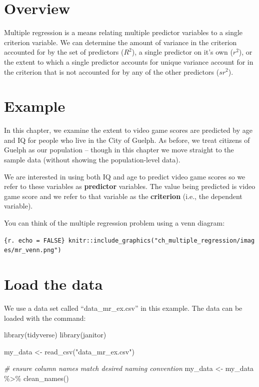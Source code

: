 \documentclass[
]{krantz}
\makeatletter
\newenvironment{Shaded}{\begin{snugshade}}{\end{snugshade}}
\newcommand{\CommentTok}[1]{\textcolor[rgb]{0.37,0.37,0.37}{\textit{#1}}}
\newcommand{\FunctionTok}[1]{\textcolor[rgb]{0,0,0}{#1}}
\newcommand{\NormalTok}[1]{#1}
\newcommand{\OtherTok}[1]{\textcolor[rgb]{0.37,0.37,0.37}{#1}}
\newcommand{\SpecialCharTok}[1]{\textcolor[rgb]{0,0,0}{#1}}
\newcommand{\StringTok}[1]{\textcolor[rgb]{0.5,0.5,0.5}{#1}}
\newenvironment{kframe}{%
\medskip{}
\setlength{\fboxsep}{.8em}
 \def\at@end@of@kframe{}%
 \ifinner\ifhmode%
  \def\at@end@of@kframe{\end{minipage}}%
  \begin{minipage}{\columnwidth}%
 \fi\fi%
 \def\FrameCommand##1{\hskip\@totalleftmargin \hskip-\fboxsep
 \colorbox{shadecolor}{##1}\hskip-\fboxsep
     \hskip-\linewidth \hskip-\@totalleftmargin \hskip\columnwidth}%
 \MakeFramed {\advance\hsize-\width
   \@totalleftmargin\z@ \linewidth\hsize
   \@setminipage}}%
 {\par\unskip\endMakeFramed%
 \at@end@of@kframe}
\renewenvironment{Shaded}{\begin{kframe}}{\end{kframe}}
\makeatother
\begin{document}
\hypertarget{overview-7}{%
\section{Overview}\label{overview-7}}

Multiple regression is a means relating multiple predictor variables to a single criterion variable. We can determine the amount of variance in the criterion accounted for by the set of predictors (\(R^2\)), a single predictor on it's own (\(r^2\)), or the extent to which a single predictor accounts for unique variance account for in the criterion that is not accounted for by any of the other predictors (\(sr^2\)).

\hypertarget{example}{%
\section{Example}\label{example}}

In this chapter, we examine the extent to video game scores are predicted by age and IQ for people who live in the City of Guelph. As before, we treat citizens of Guelph as our population -- though in this chapter we move straight to the sample data (without showing the population-level data).

We are interested in using both IQ and age to predict video game scores so we refer to these variables as \textbf{predictor} variables. The value being predicted is video game score and we refer to that variable as the \textbf{criterion} (i.e., the dependent variable).

You can think of the multiple regression problem using a venn diagram:

\texttt{\{r.\ echo\ =\ FALSE\}\ knitr::include\_graphics("ch\_multiple\_regression/images/mr\_venn.png")}

\hypertarget{load-the-data}{%
\section{Load the data}\label{load-the-data}}

We use a data set called ``data\_mr\_ex.csv'' in this example. The data can be loaded with the command:

\begin{Shaded}
\begin{Highlighting}[]
\FunctionTok{library}\NormalTok{(tidyverse)}
\FunctionTok{library}\NormalTok{(janitor)}

\NormalTok{my\_data }\OtherTok{\textless{}{-}} \FunctionTok{read\_csv}\NormalTok{(}\StringTok{"data\_mr\_ex.csv"}\NormalTok{)}

\CommentTok{\# ensure column names match desired naming convention}
\NormalTok{my\_data }\OtherTok{\textless{}{-}}\NormalTok{ my\_data }\SpecialCharTok{\%\textgreater{}\%}
  \FunctionTok{clean\_names}\NormalTok{()}
\end{Highlighting}
\end{Shaded}
\end{document}
